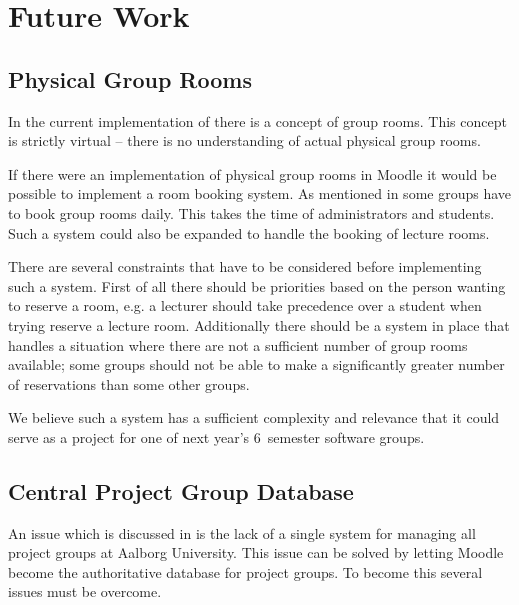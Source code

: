 \chapter{Future Work}
\label{chap:futurework}


\section{Physical Group Rooms}
\label{sec:booking}
In the current implementation of \system{} there is a concept of group rooms.
This concept is strictly virtual -- there is no understanding of actual physical group rooms.

If there were an implementation of physical group rooms in Moodle it would be possible to implement a room booking system.
As mentioned in  some groups have to book group rooms daily.
This takes the time of administrators and students.
Such a system could also be expanded to handle the booking of lecture rooms.

There are several constraints that have to be considered before implementing such a system.
First of all there should be priorities based on the person wanting to reserve a room, e.g. a lecturer should take precedence over a student when trying reserve a lecture room.
Additionally there should be a system in place that handles a situation where there are not a sufficient number of group rooms available; some groups should not be able to make a significantly greater number of reservations than some other groups.

We believe such a system has a sufficient complexity and relevance that it could serve as a project for one of next year's $6$\ths~semester software groups.

\section{Central Project Group Database}
An issue which is discussed in  is the lack of a single system for managing all project groups at Aalborg University. 
This issue can be solved by letting Moodle become the authoritative database for project groups. 
To become this several issues must be overcome. 

